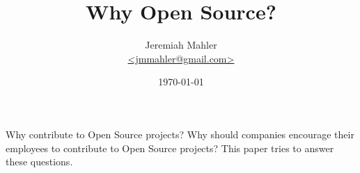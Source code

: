 \documentclass{article}
\begin{document}
\nocite{amazoncompcust}
\nocite{opensourceabuse}
\nocite{doi:10.1287/orsc.2018.1202}
\nocite{hiddenbenefit}
\nocite{enterpriseoss}
\nocite{raymond2001cathedral}
\nocite{rosen2004osl}
\nocite{wikiscovsibm}
\nocite{linus2014sievers}
\nocite{tesla2014patent}

\title{Why Open Source?}
\author{
	\Large{Jeremiah Mahler}\\
	\small{\href{mailto:jmmahler@gmail.com}{\textless jmmahler@gmail.com\textgreater}}
}
\date{\today}
\maketitle

\thispagestyle{empty}

Why contribute to Open Source projects?
Why should companies encourage their employees to contribute to
Open Source projects?
This paper tries to answer these questions.

\clearpage
\printbibliography[heading=bibintoc]
\end{document}
